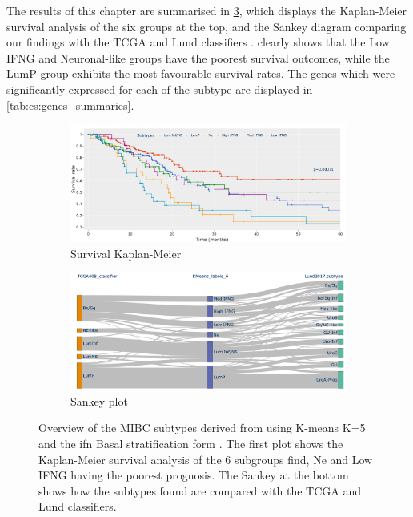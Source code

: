 The results of this chapter are summarised in \cref{fig:cs:overview_K_means_6}, which displays the Kaplan-Meier survival analysis of the six groups at the top, and the Sankey diagram comparing our findings with the TCGA and Lund classifiers \citet{Robertson2017-mg,Marzouka2018-ge}.  clearly shows that the Low IFNG and Neuronal-like groups have the poorest survival outcomes, while the LumP group exhibits the most favourable survival rates. The genes which were significantly expressed for each of the subtype are displayed in \cref{tab:cs:genes_summaries}.
 
\begin{figure}[!htb]
    \centering
    \begin{subfigure}[!t]{1.0\textwidth}
        \includegraphics[width=\textwidth,keepaspectratio]{Sections/ClusteringAnalysis/Resources/discussion/survival_K_6.png}    
        \caption{Survival Kaplan-Meier}
        \label{fig:cs:overview_survival}
    \end{subfigure}
    \centering
    \begin{subfigure}[!t]{1.0\textwidth}
        \includegraphics[width=\textwidth,keepaspectratio]{Sections/ClusteringAnalysis/Resources/discussion/KMeans_6_comp.png}
        \caption{Sankey plot}
        \label{fig:cs:overview_comp}
    \end{subfigure} 
    \centering
    \caption[Overview of the MIBC subtypes]{Overview of the MIBC subtypes derived from using K-means K=5 and the \acrshort{ifn} Basal stratification form \citet{Baker2022-bj}. The first plot shows the Kaplan-Meier survival analysis of the 6 subgroups find, Ne and Low IFNG having the poorest prognosis. The Sankey at the bottom shows how the subtypes found are compared with the TCGA \citet{Robertson2017-mg} and Lund \citet{Marzouka2018-ge} classifiers.} 
    \label{fig:cs:overview_K_means_6}
\end{figure}


